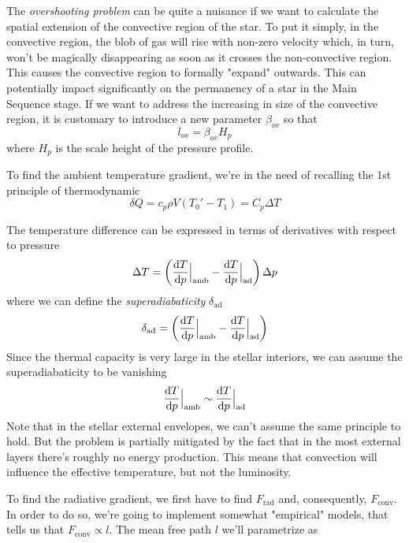 The \emph{overshooting problem} can be quite a nuisance if we want to calculate the spatial extension of the convective region of the star. To put it simply, in the convective region, the blob of gas will rise with non-zero velocity which, in turn, won't be magically disappearing as soon as it crosses the non-convective region. This causes the convective region to formally "expand" outwards. This can potentially impact significantly on the permanency of a star in the Main Sequence stage. If we want to address the increasing in size of the convective region, it is customary to introduce a new parameter $\beta_{ov}$ so that
\begin{equation*}
	l_{ov} = \beta_{ov}H_{p}
\end{equation*}
where $H_{p}$ is the scale height of the pressure profile.
\par To find the ambient temperature gradient, we're in the need of recalling the 1st principle of thermodynamic
\begin{equation}
	\delta Q = c_{p}\rho V (T_{0}'-T_{1}) = C_{p}\Delta T
	\label{eq:1stprinciple}
\end{equation}
\par The temperature difference can be expressed in terms of derivatives with respect to pressure 
\begin{equation*}
	\Delta T = \left(\frac{\text{d}T}{\text{d}p}\Big|_{\text{amb}} - \frac{\text{d}T}{\text{d}p}\Big|_{\text{ad}}\right)\Delta p
\end{equation*}
where we can define the \emph{superadiabaticity} $\delta_{\text{ad}}$
\begin{equation}
	\delta_{\text{ad}} = \left(\frac{\text{d}T}{\text{d}p}\Big|_{\text{amb}} - \frac{\text{d}T}{\text{d}p}\Big|_{\text{ad}}\right)
	\label{eq:superadiabaticity}
\end{equation}
Since the thermal capacity is very large in the stellar interiors, we can assume the superadiabaticity to be vanishing
\begin{equation*}
	\frac{\text{d}T}{\text{d}p}\Big|_{\text{amb}} \sim \frac{\text{d}T}{\text{d}p}\Big|_{\text{ad}}
\end{equation*}
Note that in the stellar external envelopes, we can't assume the same principle to hold. But the problem is partially mitigated by the fact that in the most external layers there's roughly no energy production. This means that convection will influence the effective temperature, but not the luminosity.
\par To find the radiative gradient, we first have to find $F_{\text{rad}}$ and, consequently, $F_{\text{conv}}$. In order to do so, we're going to implement somewhat "empirical" models, that tells us that $F_{\text{conv}}\propto l$. The mean free path $l$ we'll parametrize as
